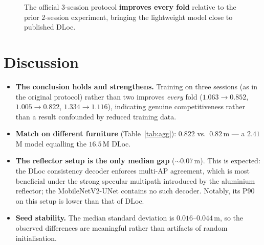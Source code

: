 \documentclass[11pt,a4paper]{article}
\begin{document}
\begin{figure}[H]
\centering
{}
\caption{The official $3$-session protocol \textbf{improves every fold} relative to the prior
$2$-session experiment, bringing the lightweight model close to published DLoc.}
\end{figure}

\section{Discussion}

\begin{itemize}[nosep]
  \item \textbf{The conclusion holds and strengthens.} Training on three sessions (as in the
  original protocol) rather than two improves \emph{every} fold ($1.063\!\to\!0.852$,
  $1.005\!\to\!0.822$, $1.334\!\to\!1.116$), indicating genuine competitiveness rather than a
  result confounded by reduced training data.
  \item \textbf{Match on different furniture} (Table~\ref{tab:agg}): $0.822$ vs.\ $0.82$\,m --- a
  $2.41$\,M model equalling the $16.5$\,M DLoc.
  \item \textbf{The reflector setup is the only median gap} (${\sim}0.07$\,m). This is expected:
  the DLoc consistency decoder enforces multi-AP agreement, which is most beneficial under the
  strong specular multipath introduced by the aluminium reflector; the MobileNetV2-UNet contains
  no such decoder. Notably, its P90 on this setup is lower than that of DLoc.
  \item \textbf{Seed stability.} The median standard deviation is $0.016$--$0.044$\,m, so the
  observed differences are meaningful rather than artifacts of random initialisation.
\end{itemize}
\end{document}
